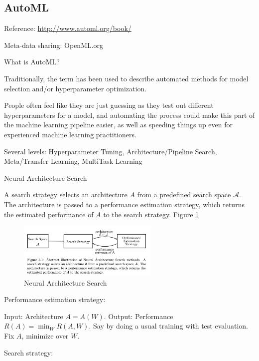 \documentclass[english]{article}
\begin{document}
\subsection{AutoML}


\benum 

\item Reference: \url{http://www.automl.org/book/}

Meta-data sharing: OpenML.org

\item What is AutoML?

Traditionally, the term has been used to describe automated methods for model selection and/or hyperparameter optimization.

People often feel like they are just guessing as they test out different hyperparameters for a model, and automating the process could make this part of the machine learning pipeline easier, as well as speeding things up even for experienced machine learning practitioners.

\item Several levels: Hyperparameter Tuning, Architecture/Pipeline Search, Meta/Transfer Learning, MultiTask Learning

\item Neural Architecture Search

\benum 
\item A search strategy selects an architecture $A$ from a predefined search space $\mathcal{A}$. The architecture is passed to a performance estimation strategy, which returns the estimated performance of $A$ to the search strategy. Figure \ref{nas} 

\begin{figure}[h!]
  \centering
  \includegraphics[width=0.6\textwidth]{nas.png}
  \caption{Neural Architecture Search}
  \label{nas}
\end{figure}

Performance estimation strategy: 

Input: Architecture $A=A(W)$. Output: Performance $R(A)=\min_W R(A,W)$. Say by doing a usual training with test evaluation. Fix $A$, minimize over $W$.


Search strategy: 
\end{document}

